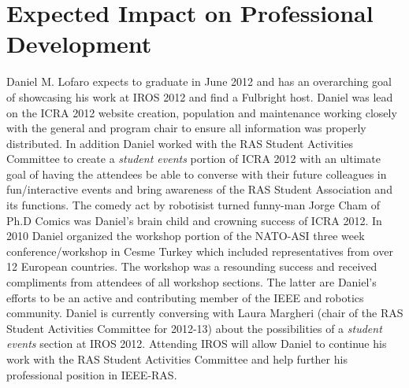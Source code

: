 \documentclass[11pt,a4paper,oneside]{report}
\begin{document}
\section*{Expected Impact on Professional Development}
Daniel M. Lofaro expects to graduate in June 2012 and has an overarching goal of showcasing his work at IROS 2012 and find a Fulbright host.
Daniel was lead on the ICRA 2012 website creation, population and maintenance working closely with the general and program chair to ensure all information was properly distributed.
In addition Daniel worked with the RAS Student Activities Committee to create a \textit{student events} portion of ICRA 2012 with an ultimate goal of having the attendees be able to converse with their future colleagues in fun/interactive events and bring awareness of the RAS Student Association and its functions.  
The comedy act by robotisist turned funny-man Jorge Cham of Ph.D Comics was Daniel's brain child and crowning success of ICRA 2012.
In 2010 Daniel organized the workshop portion of the NATO-ASI three week conference/workshop in Cesme Turkey which included representatives from over 12 European countries.
The workshop was a resounding success and received compliments from attendees of all workshop sections.
The latter are Daniel's efforts to be an active and contributing member of the IEEE and robotics community.
Daniel is currently conversing with Laura Margheri (chair of the RAS Student Activities Committee for 2012-13) about the possibilities of a \textit{student events} section at IROS 2012.
Attending IROS will allow Daniel to continue his work with the RAS Student Activities Committee and help further his professional position in IEEE-RAS.

\end{document}
